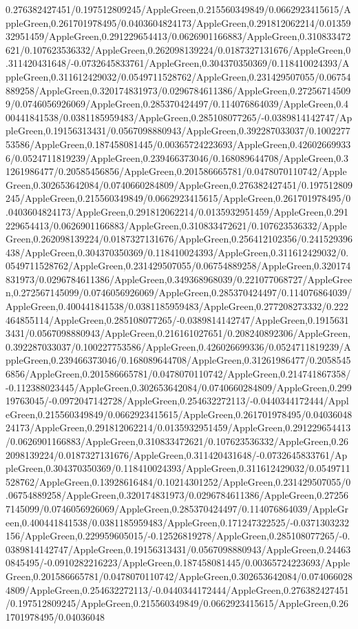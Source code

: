 {\begin{tikzternal}
{0.276382427451/0.197512809245/AppleGreen,0.215560349849/0.0662923415615/AppleGreen,0.261701978495/0.0403604824173/AppleGreen,0.291812062214/0.0135932951459/AppleGreen,0.291229654413/0.0626901166883/AppleGreen,0.310833472621/0.107623536332/AppleGreen,0.262098139224/0.0187327131676/AppleGreen,0.311420431648/-0.0732645833761/AppleGreen,0.304370350369/0.118410024393/AppleGreen,0.311612429032/0.0549711528762/AppleGreen,0.231429507055/0.06754889258/AppleGreen,0.320174831973/0.0296784611386/AppleGreen,0.272567145099/0.0746056926069/AppleGreen,0.285370424497/0.114076864039/AppleGreen,0.400441841538/0.0381185959483/AppleGreen,0.285108077265/-0.0389814142747/AppleGreen,0.19156313431/0.0567098880943/AppleGreen,0.392287033037/0.100227753586/AppleGreen,0.187458081445/0.00365724223693/AppleGreen,0.426026699336/0.0524711819239/AppleGreen,0.239466373046/0.168089644708/AppleGreen,0.31261986477/0.20585456856/AppleGreen,0.201586665781/0.0478070110742/AppleGreen,0.302653642084/0.0740660284809/AppleGreen,0.276382427451/0.197512809245/AppleGreen,0.215560349849/0.0662923415615/AppleGreen,0.261701978495/0.0403604824173/AppleGreen,0.291812062214/0.0135932951459/AppleGreen,0.291229654413/0.0626901166883/AppleGreen,0.310833472621/0.107623536332/AppleGreen,0.262098139224/0.0187327131676/AppleGreen,0.256412102356/0.241529396438/AppleGreen,0.304370350369/0.118410024393/AppleGreen,0.311612429032/0.0549711528762/AppleGreen,0.231429507055/0.06754889258/AppleGreen,0.320174831973/0.0296784611386/AppleGreen,0.349368968039/0.221077068727/AppleGreen,0.272567145099/0.0746056926069/AppleGreen,0.285370424497/0.114076864039/AppleGreen,0.400441841538/0.0381185959483/AppleGreen,0.277208273332/0.222464855114/AppleGreen,0.285108077265/-0.0389814142747/AppleGreen,0.19156313431/0.0567098880943/AppleGreen,0.216161027651/0.208240892306/AppleGreen,0.392287033037/0.100227753586/AppleGreen,0.426026699336/0.0524711819239/AppleGreen,0.239466373046/0.168089644708/AppleGreen,0.31261986477/0.20585456856/AppleGreen,0.201586665781/0.0478070110742/AppleGreen,0.214741867358/-0.112388023445/AppleGreen,0.302653642084/0.0740660284809/AppleGreen,0.29919763045/-0.0972047142728/AppleGreen,0.254632272113/-0.0440344172444/AppleGreen,0.215560349849/0.0662923415615/AppleGreen,0.261701978495/0.0403604824173/AppleGreen,0.291812062214/0.0135932951459/AppleGreen,0.291229654413/0.0626901166883/AppleGreen,0.310833472621/0.107623536332/AppleGreen,0.262098139224/0.0187327131676/AppleGreen,0.311420431648/-0.0732645833761/AppleGreen,0.304370350369/0.118410024393/AppleGreen,0.311612429032/0.0549711528762/AppleGreen,0.13928616484/0.10214301252/AppleGreen,0.231429507055/0.06754889258/AppleGreen,0.320174831973/0.0296784611386/AppleGreen,0.272567145099/0.0746056926069/AppleGreen,0.285370424497/0.114076864039/AppleGreen,0.400441841538/0.0381185959483/AppleGreen,0.171247322525/-0.0371303232156/AppleGreen,0.229959605015/-0.12526819278/AppleGreen,0.285108077265/-0.0389814142747/AppleGreen,0.19156313431/0.0567098880943/AppleGreen,0.244630845495/-0.0910282216223/AppleGreen,0.187458081445/0.00365724223693/AppleGreen,0.201586665781/0.0478070110742/AppleGreen,0.302653642084/0.0740660284809/AppleGreen,0.254632272113/-0.0440344172444/AppleGreen,0.276382427451/0.197512809245/AppleGreen,0.215560349849/0.0662923415615/AppleGreen,0.261701978495/0.04036048}
\end{tikzternal}}
